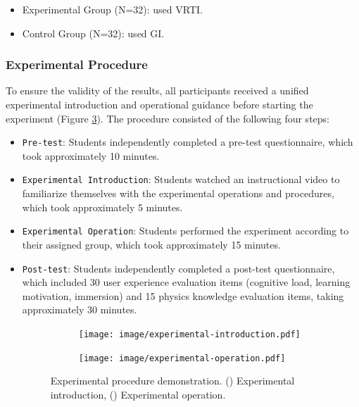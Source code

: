 \documentclass[runningheads]{llncs}
\begin{document}
\begin{itemize}
  \item Experimental Group (N=32): used VRTI.

  \item Control Group (N=32): used GI.
\end{itemize}

\subsubsection{Experimental Procedure}
To ensure the validity of the results, all participants received a unified experimental introduction and operational guidance before starting the experiment (Figure \ref{fig:experimental-procedure}). The procedure consisted of the following four steps:

\begin{itemize}
\item {\texttt{Pre-test}}: Students independently completed a pre-test questionnaire, which took approximately 10 minutes.

\item {\texttt{Experimental Introduction}}: Students watched an instructional video to familiarize themselves with the experimental operations and procedures, which took approximately 5 minutes.

\item {\texttt{Experimental Operation}}: Students performed the experiment according to their assigned group, which took approximately 15 minutes.

\item {\texttt{Post-test}}: Students independently completed a post-test questionnaire, which included 30 user experience evaluation items (cognitive load, learning motivation, immersion) and 15 physics knowledge evaluation items, taking approximately 30 minutes.

\begin{figure}
  \begin{subfigure}{0.48\linewidth} %
    \centering
    \texttt{[image: image/experimental-introduction.pdf]}
    \caption{} %
    \label{fig:experimental-introduction}
  \end{subfigure}
  \hfill %
  \begin{subfigure}{0.48\linewidth} %
    \centering
    \texttt{[image: image/experimental-operation.pdf]}
    \caption{} %
    \label{fig:experimental-operation}
  \end{subfigure}
  \caption{Experimental procedure demonstration. () Experimental introduction, () Experimental operation.}
  \label{fig:experimental-procedure}
\end{figure}

\end{itemize}
\end{document}
